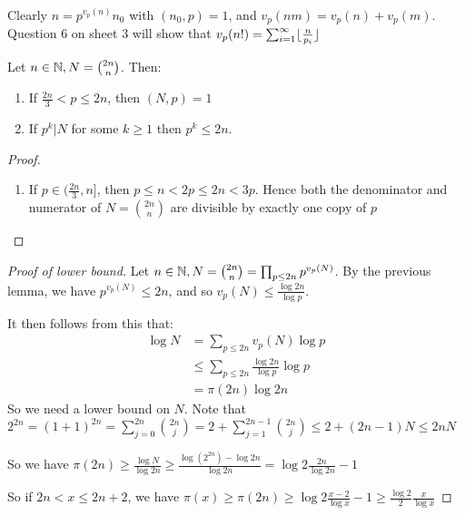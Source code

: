 \documentclass[10pt,a4paper]{article}
\begin{document}
Clearly $n = p^{v_p(n)}n_0$ with $(n_0,p) = 1$, and $v_p(nm) = v_p(n) + v_p(m)$. Question 6 on sheet 3 will show that $v_p(n!) = \sum_{i=1}^{\infty} \lfloor \frac{n}{p_i} \rfloor$
\begin{lemma}
Let $n \in \mathbb{N}, N = \binom{2n}{n}$. Then:
\begin{enumerate}
\item If $\frac{2n}{3} < p \leq 2n$, then $(N,p) = 1$
\item If $p^k | N$ for some $k \geq 1$ then $p^k \leq 2n$.
\end{enumerate}
\end{lemma}
\begin{proof}
\item
\begin{enumerate}
\item If $p \in (\frac{2n}{3}, n]$, then $p \leq n < 2p \leq 2n < 3p$. Hence both the denominator and numerator of $N = \binom{2n}{n}$ are divisible by exactly one copy of $p$
\end{enumerate}
\end{proof}
\begin{proof}[Proof of lower bound]
Let $n \in \mathbb{N}, N = \binom{2n}{n} = \prod_{p\leq 2n}p^{v_p(N)}$. By the previous lemma, we have $p^{v_p(N)} \leq 2n$, and so $v_p(N) \leq \frac{\log 2n}{\log p}$.

It then follows from this that:
\begin{align*}
\log N &= \sum_{p\leq 2n} v_p(N) \log p\\
&\leq \sum_{p\leq 2n} \frac{\log 2n}{\log p}\log p\\
&= \pi(2n) \log 2n
\end{align*}
So we need a lower bound on $N$. Note that $2^{2n} = (1+1)^{2n} = \sum_{j=0}^{2n} \binom{2n}{j} = 2 + \sum_{j=1}^{2n-1} \binom{2n}{j} \leq 2 + (2n-1)N \leq 2nN$

So we have $\pi(2n) \geq \frac{\log N}{\log 2n} \geq \frac{\log(2^{2n}) - \log 2n}{\log 2n} = \log 2 \frac{2n}{\log 2n} - 1$

So if $2n < x \leq 2n+2$, we have $\pi(x)\geq \pi(2n) \geq \log 2\frac{x-2}{\log x} - 1 \geq \frac{\log 2}{2}\frac{x}{\log x}$
\end{proof}
\end{document}
